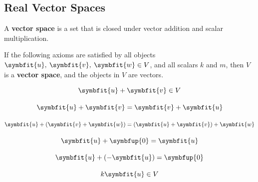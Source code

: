 \documentclass{article}
\begin{document}
\subsection{Real Vector Spaces}
\begin{definition}
    A \textbf{vector space} is a set that is closed under vector
    addition and scalar \linebreak multiplication.
\end{definition}
\begin{theorem}
    If the following axioms are satisfied by all objects
    \(\symbfit{u},\: \symbfit{v},\: \symbfit{w} \in V\), and all scalars
    \(k\) and \(m\), then \(V\) is a \textbf{vector space}, and the
    objects in \(V\) are vectors.
\end{theorem}
\begin{axiom}
    \begin{equation*} \label{axiom:5_1_1}
        \symbfit{u}+\symbfit{v} \in V
    \end{equation*}
\end{axiom}
\begin{axiom}
    \begin{equation*} \label{axiom:5_1_2}
        \symbfit{u} + \symbfit{v} = \symbfit{v} + \symbfit{u}
    \end{equation*}
\end{axiom}
\begin{axiom}
    \begin{equation*} \label{axiom:5_1_3}
        \symbfit{u} + \left(\symbfit{v} + \symbfit{w}\right) = \left(\symbfit{u} + \symbfit{v}\right) + \symbfit{w}
    \end{equation*}
\end{axiom}
\begin{axiom}
    \begin{equation*} \label{axiom:5_1_4}
        \symbfit{u} + \symbfup{0} = \symbfit{u}
    \end{equation*}
\end{axiom}
\begin{axiom}
    \begin{equation*} \label{axiom:5_1_5}
        \symbfit{u} + \left(-\symbfit{u}\right) = \symbfup{0}
    \end{equation*}
\end{axiom}
\begin{axiom}
    \begin{equation*} \label{axiom:5_1_6}
        k\symbfit{u} \in V
    \end{equation*}
\end{axiom}
\end{document}
